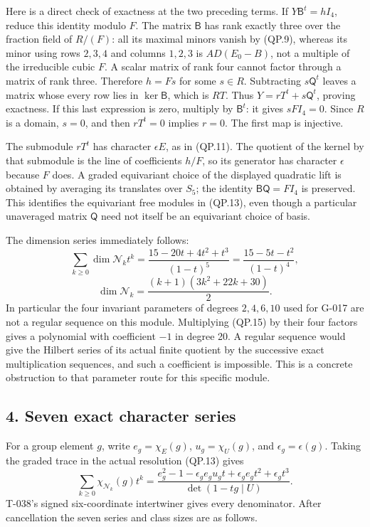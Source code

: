 \documentclass[
  10pt,
]{article}
\begin{document}
Here is a direct check of exactness at the two preceding terms. If
\(Y\mathsf B^t=hI_4\), reduce this identity modulo \(F\). The matrix
\(\mathsf B\) has rank exactly three over the fraction field of
\(R/(F)\): all its maximal minors vanish by (QP.9), whereas its minor
using rows \(2,3,4\) and columns \(1,2,3\) is \(AD(E_0-B)\), not a
multiple of the irreducible cubic \(F\). A scalar matrix of rank four
cannot factor through a matrix of rank three. Therefore \(h=Fs\) for
some \(s\in R\). Subtracting \(s\mathsf Q^t\) leaves a matrix whose
every row lies in \(\ker\mathsf B\), which is \(RT\). Thus
\(Y=rT^t+s\mathsf Q^t\), proving exactness. If this last expression is
zero, multiply by \(\mathsf B^t\): it gives \(sF I_4=0\). Since \(R\) is
a domain, \(s=0\), and then \(rT^t=0\) implies \(r=0\). The first map is
injective.

The submodule \(rT^t\) has character \(\epsilon E\), as in (QP.11). The
quotient of the kernel by that submodule is the line of coefficients
\(h/F\), so its generator has character \(\epsilon\) because \(F\) does.
A graded equivariant choice of the displayed quadratic lift is obtained
by averaging its translates over \(S_5\); the identity
\(\mathsf B\mathsf Q=FI_4\) is preserved. This identifies the
equivariant free modules in (QP.13), even though a particular unaveraged
matrix \(\mathsf Q\) need not itself be an equivariant choice of basis.

The dimension series immediately follows: \[
\sum_{k\ge0}\dim\mathcal N_k t^k
=\frac{15-20t+4t^2+t^3}{(1-t)^5}
=\frac{15-5t-t^2}{(1-t)^4},
\] \[
\boxed{\dim\mathcal N_k
=\frac{(k+1)(3k^2+22k+30)}2.}
\tag{QP.15}
\] In particular the four invariant parameters of degrees \(2,4,6,10\)
used for G-017 are not a regular sequence on this module. Multiplying
(QP.15) by their four factors gives a polynomial with coefficient \(-1\)
in degree 20. A regular sequence would give the Hilbert series of its
actual finite quotient by the successive exact multiplication sequences,
and such a coefficient is impossible. This is a concrete obstruction to
that parameter route for this specific module.

\subsection{4. Seven exact character
series}\label{seven-exact-character-series}

For a group element \(g\), write \(e_g=\chi_E(g)\), \(u_g=\chi_U(g)\),
and \(\epsilon_g=\epsilon(g)\). Taking the graded trace in the actual
resolution (QP.13) gives \[
\sum_{k\ge0}\chi_{\mathcal N_k}(g)t^k
=\frac{e_g^2-1-\epsilon_g e_gu_g t
             +\epsilon_g e_g t^2+\epsilon_g t^3}
        {\det(1-tg\mid U)}.
\tag{QP.16}
\] T-038's signed six-coordinate intertwiner gives every denominator.
After cancellation the seven series and class sizes are as follows.
\end{document}
